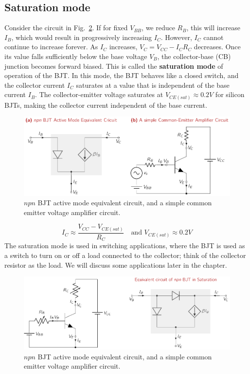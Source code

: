 \subsection{Saturation mode}
Consider the circuit in Fig.~\ref{fig:03-bjt-sat-eqt}. If for fixed $V_{BB}$, we reduce $R_B$, this will increase $I_B$, which would result in progressively increasing $I_C$. However, $I_C$ cannot continue to increase forever. As $I_C$ increases, $V_C = V_{CC} - I_{C}R_{C}$ decreases. Once its value falls sufficiently below the base voltage $V_B$, the collector-base (CB) junction becomes forward biased. This is called the \textbf{saturation mode} of operation of the BJT. In this mode, the BJT behaves like a closed switch, and the collector current $I_C$ saturates at a value that is independent of the base current $I_B$. The collector-emitter voltage saturates at $V_{CE(sat)} \approx 0.2V$ for silicon BJTs, making the collector current independent of the base current.
\begin{figure}[t]
    \centering
    \includegraphics[width=\textwidth]{figures/ch03/fig03-bjt-active-eq.pdf}
    \caption{$npn$ BJT active mode equivalent circuit, and a simple common emitter voltage amplifier circuit.}
    \label{fig:03-bjt-active-eqt}
\end{figure}
\begin{equation}
    I_C \approx \frac{V_{CC} - V_{CE(sat)}}{R_C} \quad \text{and } V_{CE(sat)} \approx 0.2V
    \label{eq:03-bjt-sat-ic}
\end{equation}
The saturation mode is used in switching applications, where the BJT is used as a switch to turn on or off a load connected to the collector; think of the collector resistor as the load. We will discuss some applications later in the chapter.

\begin{figure}[b]
    \centering
    \includegraphics[width=\textwidth]{figures/ch03/fig03-bjt-sat-eq.pdf}
    \caption{$npn$ BJT active mode equivalent circuit, and a simple common emitter voltage amplifier circuit.}
    \label{fig:03-bjt-sat-eqt}
\end{figure}

